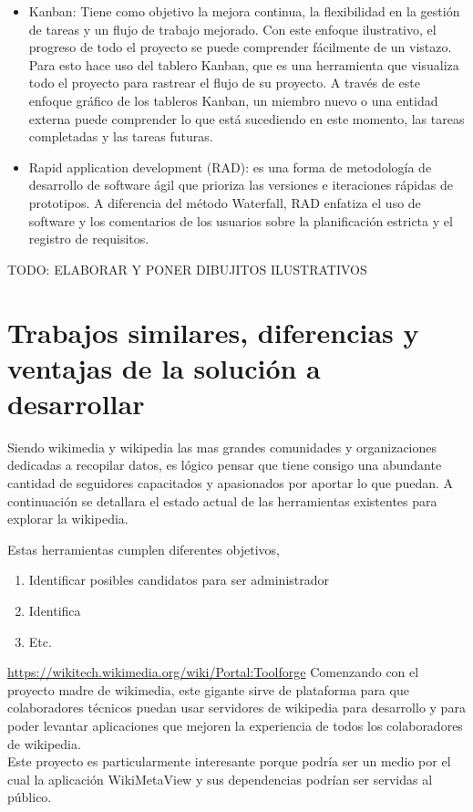\begin{itemize}
    \item Kanban: Tiene como objetivo la mejora continua, la flexibilidad en la gestión de tareas y un flujo de trabajo mejorado. Con este enfoque ilustrativo, el progreso de todo el proyecto se puede comprender fácilmente de un vistazo. Para esto hace uso del tablero Kanban, que es una herramienta que visualiza todo el proyecto para rastrear el flujo de su proyecto. A través de este enfoque gráfico de los tableros Kanban, un miembro nuevo o una entidad externa puede comprender lo que está sucediendo en este momento, las tareas completadas y las tareas futuras.
    \item Rapid application development (RAD):  es una forma de metodología de desarrollo de software ágil que prioriza las versiones e iteraciones rápidas de prototipos. A diferencia del método Waterfall, RAD enfatiza el uso de software y los comentarios de los usuarios sobre la planificación estricta y el registro de requisitos.
\end{itemize}

TODO: ELABORAR Y PONER DIBUJITOS ILUSTRATIVOS


\section{Trabajos similares, diferencias y ventajas de la solución a desarrollar}
Siendo wikimedia y wikipedia las mas grandes comunidades y organizaciones
dedicadas a recopilar datos,
es lógico pensar que tiene consigo una abundante cantidad de seguidores capacitados y
apasionados por aportar lo que puedan. A continuación se detallara el estado actual de las
herramientas existentes para explorar la wikipedia.

Estas herramientas cumplen diferentes objetivos,

\begin{enumerate}
    \item Identificar posibles candidatos para ser administrador
    \item Identifica
    \item Etc.
\end{enumerate}


\url{https://wikitech.wikimedia.org/wiki/Portal:Toolforge}
Comenzando con el proyecto madre de wikimedia, este gigante sirve de plataforma para que colaboradores técnicos puedan usar servidores de wikipedia para desarrollo y para poder levantar aplicaciones que mejoren la experiencia de todos los colaboradores de wikipedia.
\\
Este proyecto es particularmente interesante porque podría ser un medio por el cual la aplicación WikiMetaView y sus dependencias podrían ser servidas al público.


